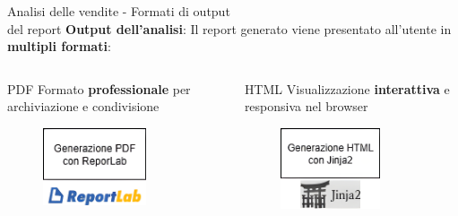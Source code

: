 \documentclass{beamer}
\begin{document}
	\begin{frame}{Analisi delle vendite - Formati di output\\ del report}
		\textbf{Output dell'analisi}: Il report generato viene presentato all'utente in \textbf{multipli formati}:

		\begin{columns}
			\begin{column}{0.33\textwidth}
				\begin{alertblock}{PDF}
					Formato \textbf{professionale} per archiviazione e condivisione
				\end{alertblock}
				\begin{figure}
					\centering
					\includegraphics[width=0.7\textwidth]{Diagramma generazione report PDF ReportLab.png}
				\end{figure}
			\end{column}
			\begin{column}{0.33\textwidth}
				\begin{exampleblock}{HTML}
					Visualizzazione \textbf{interattiva} e responsiva nel browser
				\end{exampleblock}
				\begin{figure}
					\centering
					\includegraphics[width=0.7\textwidth]{Diagramma generazione report HTML Jinja2.png}

\end{figure}
\end{column}
\end{columns}
\end{frame}
\end{document}
